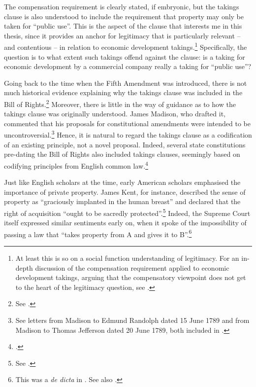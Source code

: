 The compensation requirement is clearly stated, if embryonic, but the takings clause is also understood to include the requirement that property may only be taken for ``public use''. This is the aspect of the clause that interests me in this thesis, since it provides an anchor for legitimacy that is particularly relevant -- and contentious -- in relation to economic development takings.\footnote{At least this is so on a social function understanding of legitimacy. For an in-depth discussion of the compensation requirement applied to economic development takings, arguing that the compensatory viewpoint does not get to the heart of the legitimacy question, see \cite{dyrkolbotn15}.} Specifically, the question is to what extent such takings offend against the clause: is a taking for economic development by a commercial company really a taking for ``public use''?

Going back to the time when the Fifth Amendment was introduced, there is not much historical evidence explaining why the takings clause was included in the Bill of Rights.\footnote{See \cite{fifth}.} Moreover, there is little in the way of guidance as to how the takings clause was originally understood. James Madison, who drafted it, commented that his proposals for constitutional amendments were intended to be uncontroversial.\footnote{See letters from Madison to Edmund Randolph dated 15 June 1789 and from Madison to Thomas Jefferson dated 20 June 1789, both included in \cite{madison79}.} Hence, it is natural to regard the takings clause as a codification of an existing principle, not a novel proposal. Indeed, several state constitutions pre-dating the Bill of Rights also included takings clauses, seemingly based on codifying principles from English common law.\footcite[See][299]{johnson11} 


Just like English scholars at the time, early American scholars emphasised the importance of private property. James Kent, for instance, described the sense of property as ``graciously implanted in the human breast'' and declared that the right of acquisition ``ought to be sacredly protected''.\footnote{See \cite[see][257]{kent27}.} Indeed, the Supreme Court itself expressed similar sentiments early on, when it spoke of the impossibility of passing a law that ``takes property from A and gives it to B''.\footnote{This was a {\it de dicta} in \cite[388]{calder98}. See also \cite[310]{vanhorne95}.}


